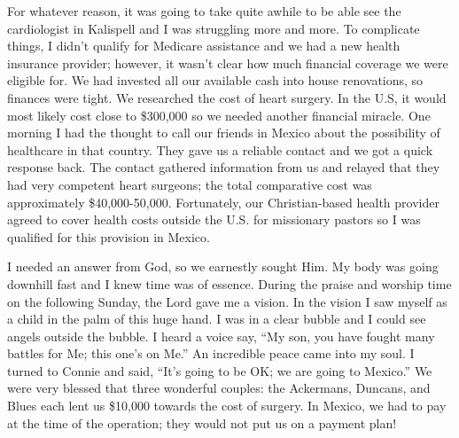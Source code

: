 \documentclass[oneside]{book}
\begin{document}
For whatever reason, it was going to take quite awhile to be able see the cardiologist in Kalispell and I was struggling more and more. To complicate things, I didn’t qualify for Medicare assistance and we had a new health insurance provider; however, it wasn’t clear how much financial coverage we were eligible for. We had invested all our available cash into house renovations, so finances were tight. We researched the cost of heart surgery. In the U.S, it would most likely cost close to \$300,000 so we needed another financial miracle. One morning I had the thought to call our friends in Mexico about the possibility of healthcare in that country. They gave us a reliable contact and we got a quick response back. The contact gathered information from us and relayed that they had very competent heart surgeons; the total comparative cost was approximately \$40,000-50,000. Fortunately, our Christian-based health provider agreed to cover health costs outside the U.S. for missionary pastors so I was qualified for this provision in Mexico. 

I needed an answer from God, so we earnestly sought Him. My body was going downhill fast and I knew time was of essence. During the praise and worship time on the following Sunday, the Lord gave me a vision. In the vision I saw myself as a child in the palm of this huge hand. I was in a clear bubble and I could see angels outside the bubble. I heard a voice say, “My son, you have fought many battles for Me; this one’s on Me.”  An incredible peace came into my soul. I turned to Connie and said, “It’s going to be OK; we are going to Mexico.” We were very blessed that three wonderful couples: the Ackermans, Duncans, and Blues each lent us \$10,000 towards the cost of surgery. In Mexico, we had to pay at the time of the operation; they would not put us on a payment plan!
\end{document}

